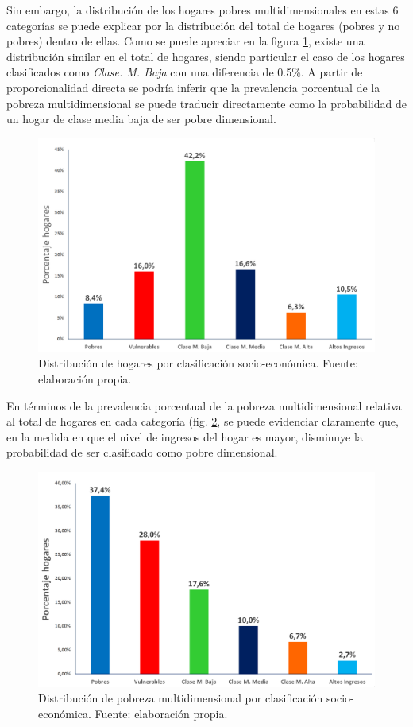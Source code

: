 \documentclass[12pt,letterpaper,spanish]{article}
\begin{document}
Sin embargo, la distribución de los hogares pobres multidimensionales en estas 6 categorías se puede explicar por la distribución del total de hogares (pobres y no pobres) dentro de ellas. Como se puede apreciar en la figura \ref{distribucion_socio}, existe una distribución similar en el total de hogares, siendo particular el caso de los hogares clasificados como \textit{Clase. M. Baja} con una diferencia de 0.5\%. A partir de proporcionalidad directa se podría inferir que la prevalencia porcentual de la pobreza multidimensional se puede traducir directamente como la probabilidad de un hogar de clase media baja de ser pobre dimensional.

\begin{figure}[!]
    \centering
    \includegraphics[height=8 cm]{Max/clasificacione_social_general.png}
    \caption{Distribución de hogares por clasificación socio-económica. Fuente: elaboración propia.}
    \label{distribucion_socio}
\end{figure}


En términos de la prevalencia porcentual de la pobreza multidimensional relativa al total de hogares en cada categoría (fig. \ref{distribucion_relativa}, se puede evidenciar claramente que, en la medida en que el nivel de ingresos del hogar es mayor, disminuye la probabilidad de ser clasificado como pobre dimensional. 


\begin{figure}[!]
    \centering
    \includegraphics[height=8 cm]{Max/tipos_prop.png}
    \caption{Distribución de pobreza multidimensional por clasificación socio-económica. Fuente: elaboración propia.}
    \label{distribucion_relativa}
\end{figure}
\end{document}
